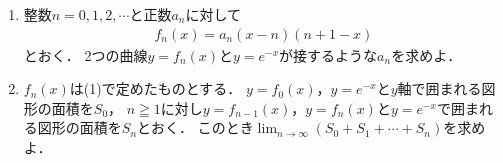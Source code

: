\documentclass[../../main.tex]{subfiles}
\begin{document}
\begin{enumerate}
  \item 整数$n=0,1,2,\cdots$と正数$a_n$に対して
    \begin{align}
      f_n(x)=a_n(x-n)(n+1-x)
    \end{align}
    とおく．
    2つの曲線$y=f_n(x)$と$y=e^{-x}$が接するような$a_n$を求めよ．
  \item $f_n(x)$は(1)で定めたものとする．
    $y=f_0(x)$，$y=e^{-x}$と$y$軸で囲まれる図形の面積を$S_0$，
    $n \geqq 1$に対し$y=f_{n-1}(x)$，$y=f_n(x)$と$y=e^{-x}$で囲まれる図形の面積を$S_n$とおく．
    このとき$\displaystyle\lim_{n\to\infty}(S_0+S_1+\cdots+S_n)$を求めよ．
\end{enumerate}
\end{document}
